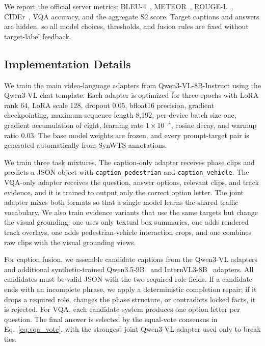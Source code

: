 \documentclass[runningheads]{llncs}
\begin{document}
We report the official server metrics: BLEU-4~\cite{papineni2002bleu}, METEOR~\cite{banerjee2005meteor}, ROUGE-L~\cite{lin2004rouge}, CIDEr~\cite{vedantam2015cider}, VQA accuracy, and the aggregate S2 score. Target captions and answers are hidden, so all model choices, thresholds, and fusion rules are fixed without target-label feedback.

\subsection{Implementation Details}

We train the main video-language adapters from Qwen3-VL-8B-Instruct using the Qwen3-VL chat template. Each adapter is optimized for three epochs with LoRA rank 64, LoRA scale 128, dropout 0.05, bfloat16 precision, gradient checkpointing, maximum sequence length 8,192, per-device batch size one, gradient accumulation of eight, learning rate $1\times10^{-4}$, cosine decay, and warmup ratio 0.03. The base model weights are frozen, and every prompt-target pair is generated automatically from SynWTS annotations.

We train three task mixtures. The caption-only adapter receives phase clips and predicts a JSON object with \texttt{caption\_pedestrian} and \texttt{caption\_vehicle}. The VQA-only adapter receives the question, answer options, relevant clips, and track evidence, and it is trained to output only the correct option letter. The joint adapter mixes both formats so that a single model learns the shared traffic vocabulary. We also train evidence variants that use the same targets but change the visual grounding: one uses only textual box summaries, one adds rendered track overlays, one adds pedestrian-vehicle interaction crops, and one combines raw clips with the visual grounding views.

For caption fusion, we assemble candidate captions from the Qwen3-VL adapters and additional synthetic-trained Qwen3.5-9B~\cite{qwen35_9b} and InternVL3-8B~\cite{internvl3} adapters. All candidates must be valid JSON with the two required role fields. If a candidate ends with an incomplete phrase, we apply a deterministic completion repair; if it drops a required role, changes the phase structure, or contradicts locked facts, it is rejected. For VQA, each candidate system produces one option letter per question. The final answer is selected by the equal-vote consensus in Eq.~\ref{eq:vqa_vote}, with the strongest joint Qwen3-VL adapter used only to break ties.
\end{document}
